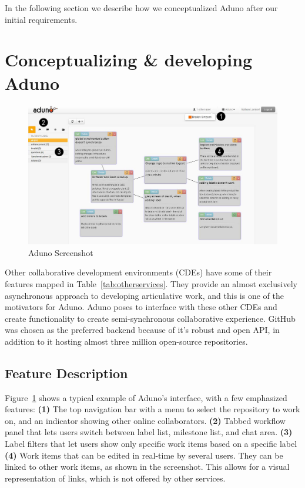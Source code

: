 \documentclass[conference]{IEEEtran}
\begin{document}
In the following section we describe how we conceptualized Aduno after our initial requirements.

\section{Conceptualizing \& developing Aduno}
\label{sec:concept}

\begin{figure}[t]
\includegraphics[width=\textwidth]{aduno-screenshot}
\caption{Aduno Screenshot}
\label{fig:adunoscreenshot}
\end{figure}

Other collaborative development environments (CDEs) have some of their features mapped in Table~\ref{tab:otherservices}.  They provide an almost exclusively asynchronous approach to developing articulative work, and this is one of the motivators for Aduno.  Aduno poses to interface with these other CDEs and create functionality to create semi-synchronous collaborative experience.  GitHub was chosen as the preferred backend because of it's robust and open API, in addition to it hosting almost three million open-source repositories.

\subsection{Feature Description}
Figure~\ref{fig:adunoscreenshot} shows a typical example of Aduno's interface, with a few emphasized features: {\bf (1)} The top navigation bar with a menu to select the repository to work on, and an indicator showing other online collaborators. {\bf (2)} Tabbed workflow panel that lets users switch between label list, milestone list, and chat area. {\bf (3)} Label filters that let users show only specific work items based on a specific label {\bf (4)} Work items that can be edited in real-time by several users. They can be linked to other work items, as shown in the screenshot. This allows for a visual representation of links, which is not offered by other services.
\end{document}
